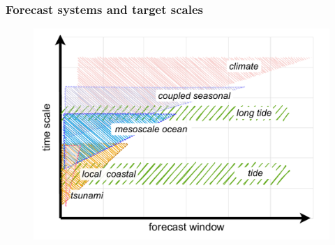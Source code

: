 \begin{frame}
\frametitle{Forecast systems and target scales}
    \begin{figure}      
     \includegraphics[height=0.8\textheight]{figures/diagrams/scales.pdf}
    \end{figure} 
\end{frame}

